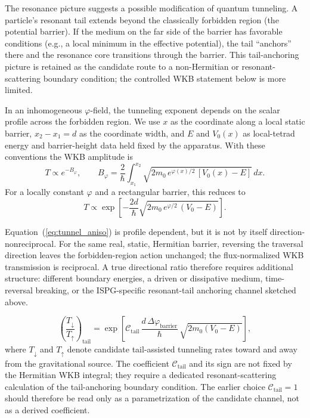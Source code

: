 \documentclass[aps,prd,onecolumn,superscriptaddress,nofootinbib,showpacs,12pt,notitlepage]{revtex4-2}
\begin{document}
The resonance picture suggests a possible modification of
quantum tunneling.
A particle's resonant tail extends beyond the classically
forbidden region (the potential barrier).  If the medium
on the far side of the barrier has favorable conditions
(e.g., a local minimum in the effective potential),
the tail ``anchors'' there and the resonance core
transitions through the barrier.  This tail-anchoring
picture is retained as the candidate route to a
non-Hermitian or resonant-scattering boundary condition;
the controlled WKB statement below is more limited.

In an inhomogeneous $\varphi$-field, the tunneling
exponent depends on the scalar profile across the forbidden
region.  We use $x$ as the coordinate along a local static
barrier, $x_2-x_1=d$ as the coordinate width, and $E$ and
$V_0(x)$ as local-tetrad energy and barrier-height data held
fixed by the apparatus.  With these conventions the WKB
amplitude is
\begin{equation}\label{eq:tunnel_aniso}
  T \propto e^{-B_{\varphi}}, \qquad
  B_{\varphi}
  = \frac{2}{\hbar}
    \int_{x_1}^{x_2}
    \sqrt{2m_0\,e^{\varphi(x)/2}\,[V_0(x)-E]}\,dx .
\end{equation}
For a locally constant $\varphi$ and a rectangular barrier,
this reduces to
\begin{equation}
  T \propto
  \exp\!\left[
    -\frac{2d}{\hbar}
    \sqrt{2m_0\,e^{\varphi/2}\,(V_0-E)}
  \right].
\end{equation}

Equation~(\ref{eq:tunnel_aniso}) is profile dependent, but
it is not by itself direction-nonreciprocal.  For the same
real, static, Hermitian barrier, reversing the traversal
direction leaves the forbidden-region action unchanged; the
flux-normalized WKB transmission is reciprocal.  A true
directional ratio therefore requires additional structure:
different boundary energies, a driven or dissipative medium,
time-reversal breaking, or the ISPG-specific resonant-tail
anchoring channel sketched above.

\begin{equation}\label{eq:tunnel_prediction}
  \boxed{
  \left(\frac{T_{\downarrow}}{T_{\uparrow}}\right)_{\mathrm{tail}}
  = \exp\!\left[
    \mathcal{C}_{\mathrm{tail}}\,
    \frac{d\,\Delta\varphi_{\mathrm{barrier}}}{\hbar}\,
    \sqrt{2m_0(V_0 - E)}
  \right],
  }
\end{equation}
where $T_{\downarrow}$ and $T_{\uparrow}$ denote candidate
tail-assisted tunneling rates toward and away from the
gravitational source.  The coefficient
$\mathcal{C}_{\mathrm{tail}}$ and its sign are not fixed by
the Hermitian WKB integral; they require a dedicated
resonant-scattering calculation of the tail-anchoring
boundary condition.  The earlier choice
$\mathcal{C}_{\mathrm{tail}}=1$ should therefore be read only
as a parametrization of the candidate channel, not as a
derived coefficient.
\end{document}
